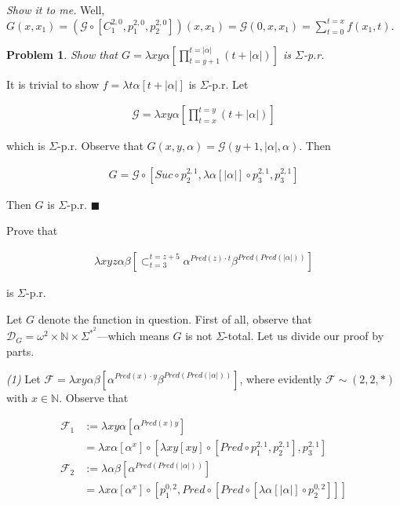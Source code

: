 \documentclass[a4paper, 12pt]{article}
\newtheorem{problem}{Problem}
\newtheorem{problem}{Problem}
\begin{document}
\textit{Show it to me.} Well, $G(x, x_1) = \left( \mathcal{G} \circ \left[
C_{1}^{2, 0}, p_1^{2, 0}, p_2^{2, 0} \right]  \right)(x, x_1) = \mathcal{G}(0,
x, x_1) = \sum_{t=0}^{t=x} f(x_1, t)$.

\begin{problem}
    Show that $G = \lambda xy\alpha \left[ \prod_{t = y+1}^{t = |\alpha|} (t + |\alpha|)
    \right] $ is $\Sigma$-p.r.
\end{problem}

It is trivial to show $f = \lambda t\alpha \left[ t + |\alpha| \right] $ is
$\Sigma$-p.r. Let 

\begin{align*}
    \mathcal{G} = \lambda xy \alpha \left[ \prod_{t=x}^{t = y} (t + |\alpha|) \right] 
\end{align*}

which is $\Sigma$-p.r. Observe that $G(x, y, \alpha) = \mathcal{G}(y + 1,
|\alpha|,
\alpha)$. Then 

\begin{align*}
    G = \mathcal{G} \circ \left[ Suc \circ p_2^{2, 1}, \lambda \alpha[|\alpha|]
    \circ p_{3}^{2, 1}, p_3^{2, 1} \right]
\end{align*}

Then $G$ is $\Sigma$-p.r. $\blacksquare$

Prove that 

\begin{align*} \lambda xyz\alpha\beta \left[ \mathop{\subset}_{t=3}^{t=z+5}
    \alpha^{Pred(z) \cdot t} \beta^{Pred\left( Pred\left( |\alpha| \right)
\right) } \right] 
\end{align*}

is $\Sigma$-p.r.

Let $G$ denote the function in question. First of all, observe that
$\mathcal{D}_G = \omega^2  \times \mathbb{N} \times \Sigma^{*}^2$---which means
$G$ is not $\Sigma$-total. Let us divide our proof by parts. 

\textit{(1)} Let $\mathcal{F} = \lambda xy \alpha \beta \left[ \alpha^{Pred(x)
\cdot y} \beta^{Pred(Pred(|\alpha|))} \right] $, where evidently $\mathcal{F}
\sim (2, 2, *)$ with $x \in \mathbb{N}$. Observe that 

\begin{align*}
    \mathcal{F}_1 &:= \lambda
    xy \alpha \left[ \alpha^{Pred(x)y} \right]\\ &= \lambda x\alpha \left[ \alpha^{x}
    \right] \circ \left[ \lambda xy\left[ xy \right] \circ \left[Pred \circ
    p_{1}^{2, 1}, p_{2}^{2, 1}\right], p_3^{2, 1} \right]   \\ 
    \mathcal{F}_2 &:= \lambda \alpha \beta \left[ \alpha^{Pred(Pred(|\alpha|))}
        \right] \\&= \lambda x\alpha[\alpha^x] \circ \left[ p_1^{0, 2}, Pred \circ
    \left[ Pred \circ \left[ \lambda \alpha [|\alpha|] \circ p_2^{0, 2} \right]  \right]  \right] 
\end{align*}
\end{document}
